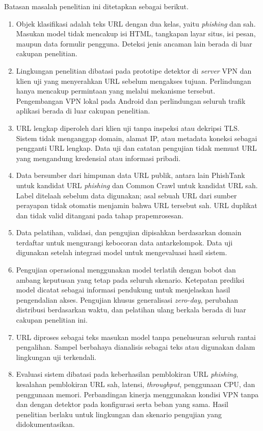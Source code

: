 Batasan masalah penelitian ini ditetapkan sebagai berikut.
\begin{enumerate}[leftmargin=*, itemsep=0.35em]
  \item Objek klasifikasi adalah teks URL dengan dua kelas, yaitu \textit{phishing} dan sah. Masukan model tidak mencakup isi HTML, tangkapan layar situs, isi pesan, maupun data formulir pengguna. Deteksi jenis ancaman lain berada di luar cakupan penelitian.
  \item Lingkungan penelitian dibatasi pada prototipe detektor di \textit{server} VPN dan klien uji yang menyerahkan URL sebelum mengakses tujuan. Perlindungan hanya mencakup permintaan yang melalui mekanisme tersebut. Pengembangan VPN lokal pada Android dan perlindungan seluruh trafik aplikasi berada di luar cakupan penelitian.
  \item URL lengkap diperoleh dari klien uji tanpa inspeksi atau dekripsi TLS. Sistem tidak menganggap domain, alamat IP, atau metadata koneksi sebagai pengganti URL lengkap. Data uji dan catatan pengujian tidak memuat URL yang mengandung kredensial atau informasi pribadi.
  \item Data bersumber dari himpunan data URL publik, antara lain PhishTank untuk kandidat URL \textit{phishing} dan Common Crawl untuk kandidat URL sah. Label ditelaah sebelum data digunakan; asal sebuah URL dari sumber perayapan tidak otomatis menjamin bahwa URL tersebut sah. URL duplikat dan tidak valid ditangani pada tahap prapemrosesan.
  \item Data pelatihan, validasi, dan pengujian dipisahkan berdasarkan domain terdaftar untuk mengurangi kebocoran data antarkelompok. Data uji digunakan setelah integrasi model untuk mengevaluasi hasil sistem.
  \item Pengujian operasional menggunakan model terlatih dengan bobot dan ambang keputusan yang tetap pada seluruh skenario. Ketepatan prediksi model dicatat sebagai informasi pendukung untuk menjelaskan hasil pengendalian akses. Pengujian khusus generalisasi \textit{zero-day}, perubahan distribusi berdasarkan waktu, dan pelatihan ulang berkala berada di luar cakupan penelitian ini.
  \item URL diproses sebagai teks masukan model tanpa penelusuran seluruh rantai pengalihan. Sampel berbahaya dianalisis sebagai teks atau digunakan dalam lingkungan uji terkendali.
  \item Evaluasi sistem dibatasi pada keberhasilan pemblokiran URL \textit{phishing}, kesalahan pemblokiran URL sah, latensi, \textit{throughput}, penggunaan CPU, dan penggunaan memori. Perbandingan kinerja menggunakan kondisi VPN tanpa dan dengan detektor pada konfigurasi serta beban yang sama. Hasil penelitian berlaku untuk lingkungan dan skenario pengujian yang didokumentasikan.
\end{enumerate}

